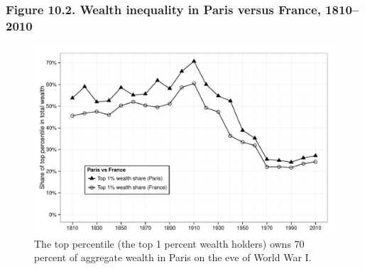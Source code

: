 \documentclass[t]{beamer}\usepackage[]{graphicx}\usepackage[]{color}
\newenvironment{knitrout}{}{} %
\begin{document}
\begin{frame}[label=Figure_10_2]
\frametitle{Figure 10.2. Wealth inequality in Paris versus France, 1810--2010}
\begin{figure}[t]
\begin{minipage}[b]{\textwidth}
\centering
\begin{knitrout}\footnotesize
{}\color{fgcolor}

{\centering \includegraphics[width=1\linewidth]{figures/bw/Figure_10_2} 

}



\end{knitrout}
\caption{The top percentile (the top 1 percent wealth holders) owns 70 percent of aggregate wealth in Paris on the eve of World War I.}
\end{minipage}
\end{figure}
\end{frame}
\end{document}
